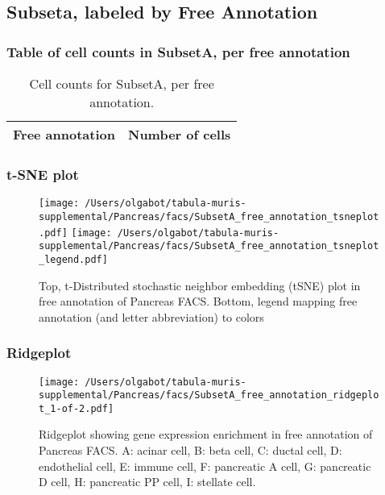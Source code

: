 \clearpage
\subsection{Subseta, labeled by Free Annotation}
\subsubsection{Table of cell counts in SubsetA, per free annotation}\begin{table}[h]
\centering
\label{my-label}
\begin{tabular}{@{}ll@{}}
\toprule

Free annotation& Number of cells \\ \midrule\bottomrule
\end{tabular}
\caption{Cell counts for SubsetA, per free annotation.}
\end{table}

\clearpage
\subsubsection{t-SNE plot}
\begin{figure}[h]
\centering
\texttt{[image: /Users/olgabot/tabula-muris-supplemental/Pancreas/facs/SubsetA\_free\_annotation\_tsneplot.pdf]}
\texttt{[image: /Users/olgabot/tabula-muris-supplemental/Pancreas/facs/SubsetA\_free\_annotation\_tsneplot\_legend.pdf]}
\caption{Top, t-Distributed stochastic neighbor embedding (tSNE) plot  in free annotation of Pancreas FACS. Bottom, legend mapping free annotation (and letter abbreviation) to colors}
\end{figure}


\clearpage
\clearpage
\subsubsection{Ridgeplot}
\begin{figure}[h]
\centering
\texttt{[image: /Users/olgabot/tabula-muris-supplemental/Pancreas/facs/SubsetA\_free\_annotation\_ridgeplot\_1-of-2.pdf]}

\caption{ Ridgeplot  showing gene expression enrichment in free annotation of Pancreas FACS. A: acinar cell, B: beta cell, C: ductal cell, D: endothelial cell, E: immune cell, F: pancreatic A cell, G: pancreatic D cell, H: pancreatic PP cell, I: stellate cell.}
\end{figure}


\clearpage
\clearpage
